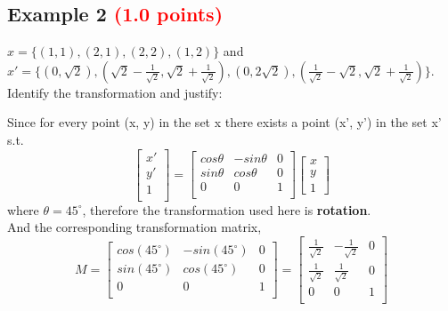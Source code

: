 \documentclass[answers]{exam}
\newcommand{\mypoints}[1]{\textcolor{red}{(#1 points)}}
\begin{document}
\subsection{Example 2 \mypoints{1.0}}
$x = \{(1,1), (2,1), (2,2), (1,2)\}$ and $x' = \{(0,\sqrt{2}), (\sqrt{2}-\frac{1}{\sqrt{2}},\sqrt{2}+\frac{1}{\sqrt{2}}), (0,2\sqrt{2}), (\frac{1}{\sqrt{2}}-\sqrt{2},\sqrt{2}+\frac{1}{\sqrt{2}})\}$. Identify the transformation and justify:
\begin{solution}
Since for every point (x, y) in the set x there exists a point (x', y') in the set x' s.t. \\
$$
\begin{bmatrix} 
x'\\
y'\\
1\\
\end{bmatrix}
=
\begin{bmatrix}
cos\theta & -sin\theta & 0\\
sin\theta & cos\theta & 0\\
0 & 0 & 1\\
\end{bmatrix}
\begin{bmatrix}
x\\
y\\
1
\end{bmatrix}
$$
where $\theta = 45^{\circ}$, therefore the transformation used here is \textbf{rotation}.\\
And the corresponding transformation matrix,\\
$$M = \begin{bmatrix}
cos(45^{\circ}) & -sin(45^{\circ}) & 0\\
sin(45^{\circ}) & cos(45^{\circ}) & 0\\
0 & 0 & 1\\
\end{bmatrix}
=
\begin{bmatrix}
\frac{1}{\sqrt{2}} & -\frac{1}{\sqrt{2}} & 0\\
\frac{1}{\sqrt{2}} & \frac{1}{\sqrt{2}} & 0\\
0 & 0 & 1\\
\end{bmatrix}$$
\end{solution}
\end{document}
